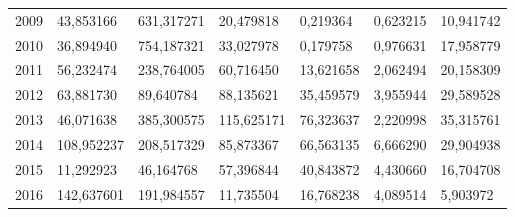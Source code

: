 \begin{table}
\begin{tabular}{p{1cm}p{2cm}p{2cm}p{2cm}p{2cm}p{2cm}p{2cm}}
 2009 &                        43,853166 &                                   631,317271 &            20,479818 &               0,219364 &                       0,623215 &                    10,941742 \\
 2010 &                        36,894940 &                                   754,187321 &            33,027978 &               0,179758 &                       0,976631 &                    17,958779 \\
 2011 &                        56,232474 &                                   238,764005 &            60,716450 &              13,621658 &                       2,062494 &                    20,158309 \\
 2012 &                        63,881730 &                                    89,640784 &            88,135621 &              35,459579 &                       3,955944 &                    29,589528 \\
 2013 &                        46,071638 &                                   385,300575 &           115,625171 &              76,323637 &                       2,220998 &                    35,315761 \\
 2014 &                       108,952237 &                                   208,517329 &            85,873367 &              66,563135 &                       6,666290 &                    29,904938 \\
 2015 &                        11,292923 &                                    46,164768 &            57,396844 &              40,843872 &                       4,430660 &                    16,704708 \\
 2016 &                       142,637601 &                                   191,984557 &            11,735504 &              16,768238 &                       4,089514 &                     5,903972 \\
\bottomrule
\end{tabular}
\end{table}
